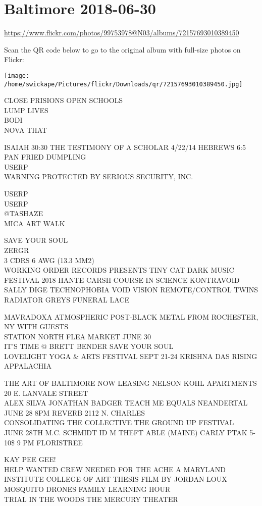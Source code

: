 \documentclass[10pt,letterpaper]{article}
\begin{document}
\section*{Baltimore 2018-06-30}

\url{https://www.flickr.com/photos/99753978@N03/albums/72157693010389450}

Scan the QR code below to go to the original album with full-size photos on Flickr:

\texttt{[image: /home/swickape/Pictures/flickr/Downloads/qr/72157693010389450.jpg]}


CLOSE PRISIONS OPEN SCHOOLS\\
LUMP LIVES\\
BODI\\
NOVA THAT

ISAIAH 30:30 THE TESTIMONY OF A SCHOLAR 4/22/14 HEBREWS 6:5\\
PAN FRIED DUMPLING\\
USERP\\
WARNING PROTECTED BY SERIOUS SECURITY, INC.

USERP\\
USERP\\
@TASHAZE\\
MICA ART WALK

SAVE YOUR SOUL\\
ZERGR\\
3 CDRS 6 AWG (13.3 MM2)\\
WORKING ORDER RECORDS PRESENTS TINY CAT DARK MUSIC FESTIVAL 2018 HANTE CARSH COURSE IN SCIENCE KONTRAVOID SALLY DIGE TECHNOPHOBIA VOID VISION REMOTE/CONTROL TWINS RADIATOR GREYS FUNERAL LACE

MAVRADOXA ATMOSPHERIC POST{-}BLACK METAL FROM ROCHESTER, NY WITH GUESTS\\
STATION NORTH FLEA MARKET JUNE 30\\
IT'S TIME @ BRETT BENDER SAVE YOUR SOUL\\
LOVELIGHT YOGA \& ARTS FESTIVAL SEPT 21{-}24 KRISHNA DAS RISING APPALACHIA

THE ART OF BALTIMORE NOW LEASING NELSON KOHL APARTMENTS 20 E. LANVALE STREET\\
ALEX SILVA JONATHAN BADGER TEACH ME EQUALS NEANDERTAL JUNE 28 8PM REVERB 2112 N. CHARLES\\
CONSOLIDATING THE COLLECTIVE THE GROUND UP FESTIVAL\\
JUNE 28TH M.C. SCHMIDT ID M THEFT ABLE (MAINE) CARLY PTAK 5{-}10\$ 9 PM FLORISTREE

KAY PEE GEE!\\
HELP WANTED CREW NEEDED FOR THE ACHE A MARYLAND INSTITUTE COLLEGE OF ART THESIS FILM BY JORDAN LOUX\\
MOSQUITO DRONES FAMILY LEARNING HOUR\\
TRIAL IN THE WOODS THE MERCURY THEATER
\end{document}

